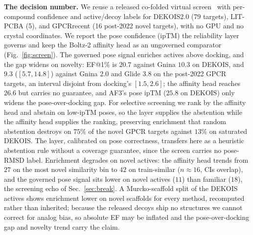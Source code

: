\documentclass[10pt]{article}
\begin{document}
\textbf{The decision number.} We reuse a released co-folded virtual screen~\citep{shen2026vs}
with per-compound confidence and active/decoy labels for DEKOIS2.0 (79 targets), LIT-PCBA (5),
and GPCRrecent (16 post-2022 novel targets), with no GPU and no crystal coordinates. We report
the pose confidence (ipTM) the reliability layer governs and keep the Boltz-2 affinity head as an
ungoverned comparator (Fig.~\ref{fig:screen}). The governed pose signal enriches actives above
docking, and the gap widens on novelty: EF@1\% is $20.7$ against Gnina $10.3$ on DEKOIS, and $9.3$
($[5.7,14.8]$) against Gnina $2.0$ and Glide $3.8$ on the post-2022 GPCR targets, an interval
disjoint from docking's $[1.5,2.6]$; the affinity head reaches $26.6$ but carries no guarantee, and
AF3's pose ipTM ($25.8$ on DEKOIS) only widens the pose-over-docking gap. For selective screening we
rank by the affinity head and abstain on low-ipTM poses, so the layer supplies the abstention while
the affinity head supplies the ranking, preserving enrichment that random abstention destroys on
$75\%$ of the novel GPCR targets against $13\%$ on saturated DEKOIS. The layer, calibrated on pose
correctness, transfers here as a heuristic abstention rule without a coverage guarantee, since the
screen carries no pose-RMSD label. Enrichment degrades on novel actives: the affinity head trends
from $27$ on the most novel similarity bin to $42$ on train-similar ($n\!\approx\!16$, CIs overlap),
and the governed pose signal sits lower on novel actives ($11$) than familiar ($18$), the screening
echo of Sec.~\ref{sec:break}. A Murcko-scaffold split of the DEKOIS actives shows enrichment lower on
novel scaffolds for every method, recomputed rather than inherited; because the released decoys ship
no structures we cannot correct for analog bias, so absolute EF may be inflated and the
pose-over-docking gap and novelty trend carry the claim.
\end{document}
